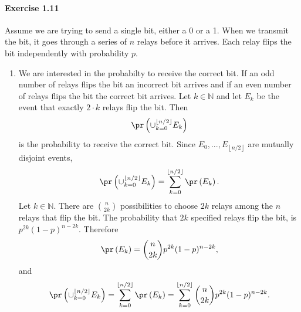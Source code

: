 \paragraph{Exercise 1.11} Assume we are trying to send a single bit, either a 0
 or a 1. When we transmit the bit, it goes through a series of $n$ relays
 before it arrives. Each relay flips the bit independently with probability $p$.
 \begin{enumerate}
   \item[(a)] We are interested in the probabilty to receive the correct bit.
    If an odd number of relays flips the bit an incorrect bit arrives and if
    an even number of relays flips the bit the correct bit arrives. Let $k \in
    \mathbb{N}$ and let $E_k$ be the event that exactly $2 \cdot k$ relays flip
    the bit. Then
    \[ \pr\left(\cup_{k=0}^{\left\lfloor n/2 \right\rfloor} E_k \right) \]
    is the probability to receive the correct bit.
    Since $E_0,...,E_{\left\lfloor n/2 \right\rfloor}$ are mutually
    disjoint events,
    \[
      \pr\left(\cup_{k=0}^{\left\lfloor n/2 \right\rfloor} E_k \right)
      = \sum_{k=0}^{\left\lfloor n/2 \right\rfloor} \pr\left( E_k \right).
    \]
    Let $k \in \mathbb{N}$. There are $\binom{n}{2k}$ possibilities to choose $2k$
    relays among the $n$ relays that flip the bit. The probability that $2k$
    specified relays flip the bit, is $p^{2k}(1-p)^{n-2k}$. Therefore
    \[ \pr\left(E_k\right) = \binom{n}{2k} p^{2k}(1-p)^{n-2k}, \]
    and
    \[
      \pr\left(\cup_{k=0}^{\left\lfloor n/2 \right\rfloor} E_k \right)
      = \sum_{k=0}^{\left\lfloor n/2 \right\rfloor} \pr\left( E_k \right)
      = \sum_{k=0}^{\left\lfloor n/2 \right\rfloor} \binom{n}{2k} p^{2k}(1-p)^{n-2k}.
    \]


\end{enumerate}
